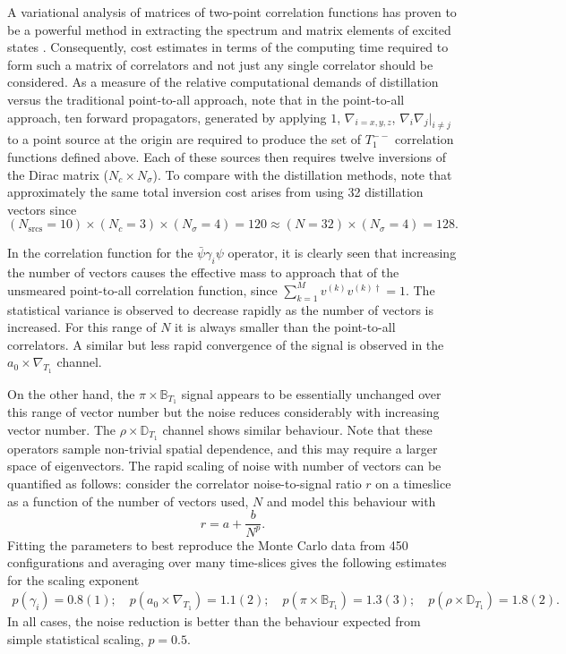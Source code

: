 A variational analysis \cite{Michael:1985ne,Luscher:1990ck} of matrices of
two-point correlation functions has proven to be a powerful method in
extracting the spectrum and matrix elements of excited states
\cite{Dudek:2006ej}. Consequently, cost estimates in terms of the computing
time required to form such a matrix of correlators and not just any single
correlator should be considered.
As a measure of the relative computational demands of distillation versus the
traditional point-to-all approach, note that in the point-to-all approach,
ten forward propagators, generated by applying
    $1$, $\nabla_{i=x,y,z}$, $\nabla_i \nabla_j|_{i \neq j}$ to a
    point source at the origin are required to produce the set of $T_1^{--}$
correlation functions defined above.  Each of these sources then requires twelve
inversions of the Dirac matrix ($N_c \times N_\sigma$).
To compare with the distillation methods, note that approximately the same
total inversion cost arises from using 32 distillation vectors since
\begin{equation}
(N_{\mathrm{srcs}}=10) \times (N_c = 3) \times (N_\sigma = 4) = 120 \approx (N = 32) \times (N_\sigma = 4) = 128.
\end{equation}

In the correlation function for the $\bar\psi\gamma_i\psi$ operator, it is
clearly seen that increasing the number of vectors causes the effective mass
to approach that of the unsmeared point-to-all correlation function, since
$\sum_{k=1}^M v^{(k)} v^{(k)\dag} = 1$.
The statistical variance is observed to decrease rapidly as the number
of vectors is increased. For this range of $N$ it is
always smaller than the point-to-all correlators. A similar but less rapid
convergence of the signal is observed in the $a_0\times \nabla_{T_1}$ channel.

On the other hand, the $\pi \times \mathbb{B}_{T_1}$ signal appears to be
essentially unchanged over this range of vector number but the noise reduces
considerably with increasing vector number. The $\rho \times \mathbb{D}_{T_1}$ channel shows similar behaviour.
Note that these operators sample non-trivial spatial
dependence, and this may require a larger space of eigenvectors.
The rapid scaling of noise with number of vectors can be quantified as
follows: consider the correlator noise-to-signal ratio $r$ on a timeslice as a
function of the number of vectors used, $N$ and model this behaviour with
\begin{equation}
r = a + \frac{b}{N^p}. \label{noise}
\end{equation}
Fitting the parameters to best reproduce the Monte Carlo data from 450
configurations and averaging
over many time-slices gives the following estimates for
the scaling exponent
\begin{eqnarray}
p(\gamma_i) = 0.8(1); \quad p(a_0\times \nabla_{T_1}) = 1.1(2); \quad
p(\pi \times \mathbb{B}_{T_1}) = 1.3(3); \quad p(\rho\times \mathbb{D}_{T_1}) = 1.8(2). \nonumber
\end{eqnarray}
In all cases, the noise reduction is better than the behaviour expected from
simple statistical scaling, $p=0.5$.

